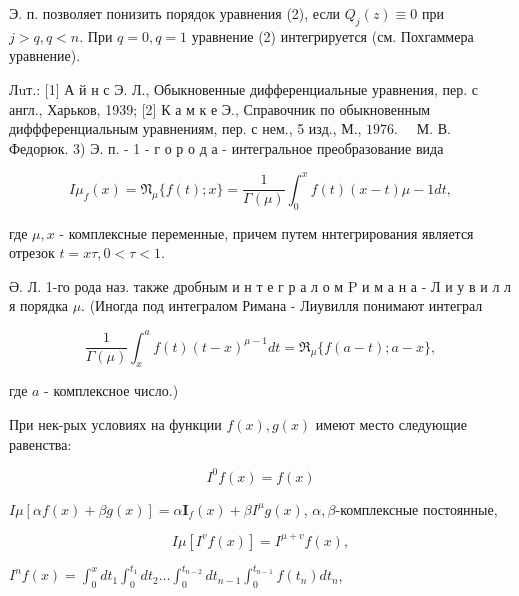 \documentclass[10pt]{article}
\begin{document}
Э. п. позволяет понизить порядок уравнения (2), если $Q_{j}(z) \equiv 0$ при $j>q, q<n$. При $q=0, q=1$ уравнение (2) интегрируется (см. Похгаммера уравнение).



Лuт.: [1] А й н с Э. Л., Обыкновенные дифференциальные уравнения, пер. с англ., Харьков, 1939; [2] К а м к е Э., Справочник по обыкновенным диффференциальным уравнениям, пер. с нем., 5 изд., М., $1976 . \quad$ М. В. Федорюк. 3) Э. п. - 1 - г о р о д а - интегральное преобразование вида



\[

I \mu_{f}(x)=\mathfrak{N}_{\mu}\{f(t) ; x\}=\frac{1}{\Gamma(\mu)} \int_{0}^{x} f(t)(x-t) \mu-1 d t,

\]



где $\mu, x$ - комплексные переменные, причем путем ннтегрирования является отрезок $t=x \tau, 0<\tau<1$.



Ә. Л. 1-го рода наз. также дробным и н т е г р а л о м $\mathrm{P}$ и м а н а - Л и у в и л л я порядка $\mu$. (Иногда под интегралом Римана - Лиувилля понимают интеграл



\[

\frac{1}{\Gamma(\mu)} \int_{x}^{a} f(t)(t-x)^{\mu-1} d t=\mathfrak{R}_{\mu}\{f(a-t) ; a-x\},

\]



где $a$ - комплексное число.)



При нек-рых условиях на функции $f(x), g(x)$ имеют место следующие равенства:



\[

I^{0} f(x)=f(x)

\]



$I \mu[\alpha f(x)+\beta g(x)]=\alpha \boldsymbol{I}_{f}(x)+\beta I^{\mu} g(x)$, $\alpha, \beta$-комплексные постоянные,



\[

I \mu\left[I^{v} f(x)\right]=I^{\mu+v} f(x),

\]



$I^{n} f(x)=\int_{0}^{x} d t_{1} \int_{0}^{t_{1}} d t_{2} \ldots \int_{0}^{t_{n-2}} d t_{n-1} \int_{0}^{t_{n-1}} f\left(t_{n}\right) d t_{n}$,
\end{document}
